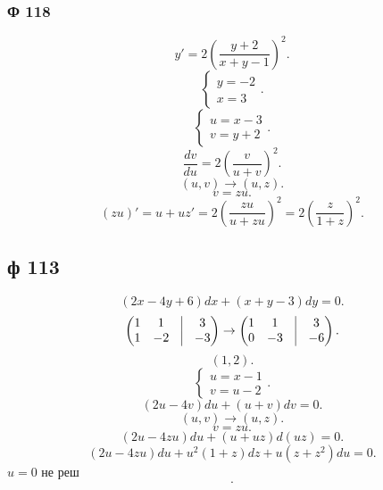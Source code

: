 \documentclass[14pt]{extarticle}
\begin{document}
\subsubsection{Ф 118}
\[
	y' = 2 (\frac{y + 2}{x + y -1}) ^2
	.\]
\[
	\begin{cases}
		y = -2 \\
		x = 3
	\end{cases}
	.\]
\[
	\begin{cases}
		u = x - 3 \\
		v = y + 2
	\end{cases}
	.\]
\[
	\frac{dv}{du} = 2 (\frac{v}{u + v})^2
	.\]
\[
	(u,v) \to (u,z)
	.\]
\[
	v = zu
	.\]
\[
	(zu)' = u + uz' = 2(\frac{zu}{u + zu})^2 = 2 (\frac{z}{1 + z}) ^2
	.\]
\subsection{ф 113}
\[
	(2x - 4y + 6) dx + (x + y -3) dy = 0
	.\]
\[
	\begin{pmatrix}
		1 & 1  & \vline & 3  \\
		1 & -2 & \vline & -3 \\
	\end{pmatrix}
	\to
	\begin{pmatrix}
		1 & 1  & \vline & 3  \\
		0 & -3 & \vline & -6
	\end{pmatrix}
	.\]
\[
	(1,2)
	.\]
\[
	\begin{cases}
		u = x - 1 \\
		v = u - 2
	\end{cases}
	.\]
\[
	(2 u - 4 v) d u + (u + v) dv = 0
	.\]
\[
	(u,v) \to (u,z)
	.\]
\[
	v = zu
	.\]
\[
	(2u - 4zu) du + (u + uz) d(uz) = 0
	.\]
\[
	(2u - 4zu) du + u^2(1 + z) dz + u(z + z^2) du= 0
	.\]
$u = 0 $ не реш
\[
	.\]
\end{document}
